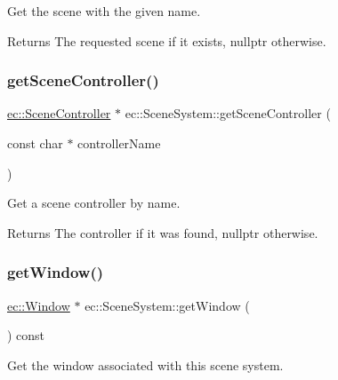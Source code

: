 Get the scene with the given name. 

\begin{DoxyReturn}{Returns}
The requested scene if it exists, nullptr otherwise. 
\end{DoxyReturn}
\mbox{\label{classec_1_1_scene_system_a0f897d342ba9a7ed8a06a478e6834c6c}} 
\subsubsection{\texorpdfstring{get\+Scene\+Controller()}{getSceneController()}}
{\footnotesize\ttfamily \mbox{\hyperlink{classec_1_1_scene_controller}{ec\+::\+Scene\+Controller}} $\ast$ ec\+::\+Scene\+System\+::get\+Scene\+Controller (\begin{DoxyParamCaption}\item[{const char $\ast$}]{controller\+Name }\end{DoxyParamCaption})}



Get a scene controller by name. 

\begin{DoxyReturn}{Returns}
The controller if it was found, nullptr otherwise. 
\end{DoxyReturn}
\mbox{\label{classec_1_1_scene_system_afc687c570e4c1b83a85bf2bd69fa86eb}} 
\subsubsection{\texorpdfstring{get\+Window()}{getWindow()}}
{\footnotesize\ttfamily \mbox{\hyperlink{classec_1_1_window}{ec\+::\+Window}} $\ast$ ec\+::\+Scene\+System\+::get\+Window (\begin{DoxyParamCaption}{ }\end{DoxyParamCaption}) const}



Get the window associated with this scene system. 

\mbox{\label{classec_1_1_scene_system_a192ef0c17aaa7893a6b2491ef557cfb6}} 
